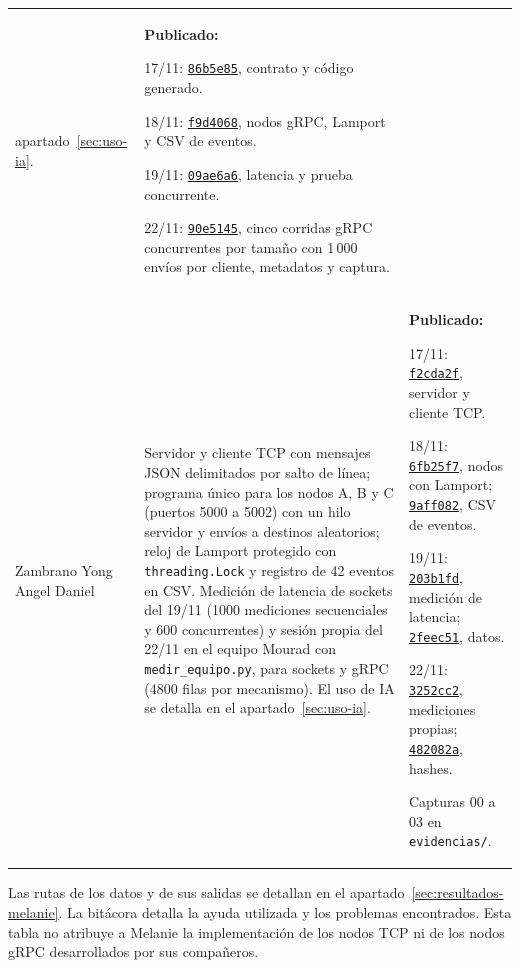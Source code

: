 \begin{table}[htbp]
\begin{tabularx}{\linewidth}{>{\raggedright\arraybackslash}p{2.6cm}>{\raggedright\arraybackslash}X>{\raggedright\arraybackslash}p{4.8cm}}
apartado~\ref{sec:uso-ia}.
& \textbf{Publicado:}
\par 17/11: \href{https://github.com/iMouraad/PE-U1-MPZ/commit/86b5e85ca08861bdac21fcd195c7f05e2df26bcc}{\texttt{86b5e85}}, contrato y código generado.
\par 18/11: \href{https://github.com/iMouraad/PE-U1-MPZ/commit/f9d406813e207d75d3285e051fc182d5c5de641d}{\texttt{f9d4068}}, nodos gRPC, Lamport y CSV de eventos.
\par 19/11: \href{https://github.com/iMouraad/PE-U1-MPZ/commit/09ae6a6151b1b87902eeed184d9b445f4ec1622e}{\texttt{09ae6a6}}, latencia y prueba concurrente.
\par 22/11: \href{https://github.com/iMouraad/PE-U1-MPZ/commit/90e5145}{\texttt{90e5145}}, cinco corridas gRPC concurrentes por tamaño con 1\,000 envíos por cliente, metadatos y captura. \\
\addlinespace
Zambrano Yong Angel Daniel
& Servidor y cliente TCP con mensajes JSON delimitados por salto
de línea; programa único para los nodos A, B y C (puertos 5000 a 5002)
con un hilo servidor y envíos a destinos aleatorios; reloj de Lamport
protegido con \texttt{threading.Lock} y registro de 42 eventos en CSV.
Medición de latencia de sockets del 19/11 (1000 mediciones secuenciales
y 600 concurrentes) y sesión propia del 22/11 en el equipo Mourad con
\texttt{medir\_equipo.py}, para sockets y gRPC (4800 filas por mecanismo).
El uso de IA se detalla en el apartado~\ref{sec:uso-ia}.
& \textbf{Publicado:}
\par 17/11: \href{https://github.com/iMouraad/PE-U1-MPZ/commit/f2cda2fa390289f92c147001083e2d4a762343cc}{\texttt{f2cda2f}}, servidor y cliente TCP.
\par 18/11: \href{https://github.com/iMouraad/PE-U1-MPZ/commit/6fb25f72f4438cb471d621e66ba2cf425eb21fca}{\texttt{6fb25f7}}, nodos con Lamport; \href{https://github.com/iMouraad/PE-U1-MPZ/commit/9aff082a660cc7bc8fe8e712b92db156136886a0}{\texttt{9aff082}}, CSV de eventos.
\par 19/11: \href{https://github.com/iMouraad/PE-U1-MPZ/commit/203b1fd3ab3fcb19ec392932d67e47eec7e497e1}{\texttt{203b1fd}}, medición de latencia; \href{https://github.com/iMouraad/PE-U1-MPZ/commit/2feec51154b9d10b508b5b6a0db44be563d4bd69}{\texttt{2feec51}}, datos.
\par 22/11: \href{https://github.com/iMouraad/PE-U1-MPZ/commit/3252cc245fddf07cfb16efb3e48a4afebcca5b2a}{\texttt{3252cc2}}, mediciones propias; \href{https://github.com/iMouraad/PE-U1-MPZ/commit/482082ad641d33e25c9be1332f30d0496e3556f7}{\texttt{482082a}}, hashes.
\par Capturas 00 a 03 en \texttt{evidencias/}. \\
\bottomrule
\end{tabularx}
\end{table}

Las rutas de los datos y de sus salidas se detallan en el
apartado~\ref{sec:resultados-melanie}.
La bitácora detalla la ayuda utilizada y los problemas encontrados.
Esta tabla no atribuye a Melanie la implementación de los nodos TCP
ni de los nodos gRPC desarrollados por sus compañeros.
